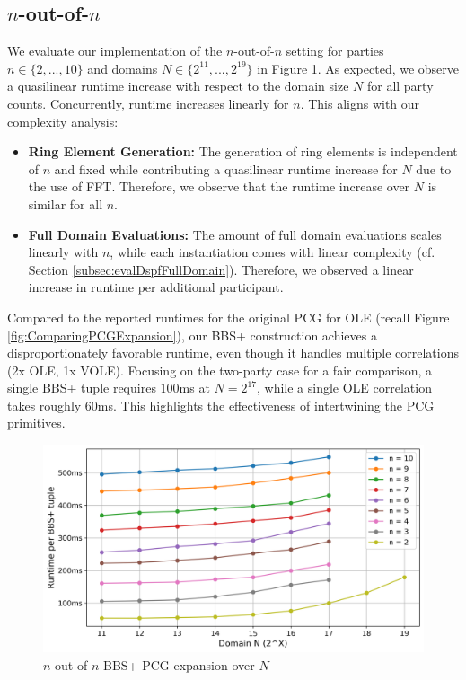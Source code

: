 \subsection{$n$-out-of-$n$}
We evaluate our implementation of the $n$-out-of-$n$ setting for parties $n\in \{2, ..., 10\}$ and domains $N\in \{2^{11}, ...,2^{19}\}$ in Figure \ref{fig:BBSnoutofn}. As expected, we observe a quasilinear runtime increase with respect to the domain size $N$ for all party counts. Concurrently, runtime increases linearly for $n$. This aligns with our complexity analysis:

\begin{itemize}
    \item \textbf{Ring Element Generation:} The generation of ring elements is independent of $n$ and fixed while contributing a quasilinear runtime increase for $N$ due to the use of FFT. Therefore, we observe that the runtime increase over $N$ is similar for all $n$.
    \item \textbf{Full Domain Evaluations:} The amount of full domain evaluations scales linearly with $n$, while each instantiation comes with linear complexity (cf. Section \ref{subsec:evalDspfFullDomain}). Therefore, we observed a linear increase in runtime per additional participant.
\end{itemize}

Compared to the reported runtimes for the original PCG for OLE (recall Figure \ref{fig:ComparingPCGExpansion}), our BBS+ construction achieves a disproportionately favorable runtime, even though it handles multiple correlations (2x OLE, 1x VOLE). Focusing on the two-party case for a fair comparison, a single BBS+ tuple requires $100$ms at $N=2^{17}$, while a single OLE correlation takes roughly $60$ms. This highlights the effectiveness of intertwining the PCG primitives.

\begin{figure}[t]
    \centering
    \includegraphics[scale=0.49]{images/plots/bbs_pcg_NoutofN.png}
    \caption{$n$-out-of-$n$ BBS+ PCG expansion over $N$}
    \label{fig:BBSnoutofn}
\end{figure}

